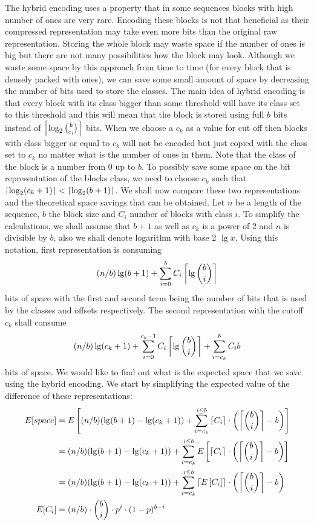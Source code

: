 The hybrid encoding uses a property that in some sequences blocks with high number
of ones are very rare. Encoding these blocks is not that beneficial as their
compressed representation may take even more bits than the original raw
representation. Storing the whole block may waste space if the number of
ones is big but there are not many possibilities how the block may look.
Although we waste some space by this approach from time to time (for every
block that is densely packed with ones), we can save some small
amount of space by decreasing the number of bits used to store the classes.
The main idea of hybrid encoding is that every block with its
class bigger than some threshold will have its class set to this threshold
and this will mean that the block is stored using full $b$ bits instead of
$\left\lceil \log_2{b\choose c_i} \right\rceil$ bits. When we choose a $c_k$ as a value for cut off
then blocks with class bigger or equal to $c_k$ will not be encoded but just
copied with the class set to $c_k$ no matter what is the number of ones in them.
Note that the class of the block
is a number from 0 up to $b$. To possibly save some space on the bit representation
of the blocks class, we need to choose $c_k$ such that $\left\lceil \log_2(c_k+1) \right\rceil < \left\lceil \log_2(b+1) \right\rceil$.
We shall now compare these two representations and the theoretical space savings that
can be obtained. Let $n$ be a length of the sequence, $b$ the block size and $C_i$
number of blocks with class $i$. To simplify the calculations, we shall assume that $b+1$
as well as $c_k$ is a power of 2 and $n$ is divisible by $b$, also we shall
denote logarithm with base 2 $\lg x$. Using this notation, first representation is
consuming $$(n/b)\lg (b+1) + \sum_{i=0}^{b} C_i\left\lceil \lg {b\choose i} \right\rceil$$
bits of space with the first and second term being the number of bits that
is used by the classes and offsets respectively. The second representation
with the cutoff $c_k$ shall consume $$(n/b)\lg (c_k+1) + \sum_{i=0}^{c_k-1}C_i\left\lceil \lg {b\choose i} \right\rceil + \sum_{i=c_k}^{b}C_i b$$
bits of space. We would like to find out what is the expected space that we save
using the hybrid encoding. We start by simplifying the expected value of the
difference of these representations:
\begin{align}
E[space] &= E\left[(n/b)(\lg(b+1)-\lg(c_k+1)) + \sum_{i=c_k}^{i\leq b}\left\lceil C_i \right\rceil\cdot \left(\left\lceil {b\choose i} \right\rceil - b\right)\right] \nonumber\\
&=(n/b)(\lg(b+1)-\lg(c_k+1)) + \sum_{i=c_k}^{i\leq b}E\left[\left\lceil C_i \right\rceil\cdot \left(\left\lceil {b\choose i} \right\rceil - b\right)\right] \nonumber\\
&=(n/b)(\lg(b+1)-\lg(c_k+1)) + \sum_{i=c_k}^{i\leq b}\left\lceil E\left[C_i\right] \right\rceil\cdot \left(\left\lceil {b\choose i} \right\rceil - b\right) \nonumber\\
E[C_i] &= (n/b)\cdot {b\choose i}\cdot p^i\cdot (1-p)^{b-i} \label{eq:hybrid_encoding_expected_c_i}
\end{align}

